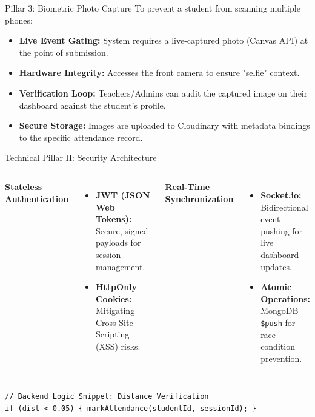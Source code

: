 \documentclass[11pt, aspectratio=169]{beamer}
\begin{document}
\begin{frame}{Pillar 3: Biometric Photo Capture}
    To prevent a student from scanning multiple phones:
    \begin{itemize}
        \item \textbf{Live Event Gating:} System requires a live-captured photo (Canvas API) at the point of submission.
        \item \textbf{Hardware Integrity:} Accesses the front camera to ensure "selfie" context.
        \item \textbf{Verification Loop:} Teachers/Admins can audit the captured image on their dashboard against the student's profile.
        \item \textbf{Secure Storage:} Images are uploaded to Cloudinary with metadata bindings to the specific attendance record.
    \end{itemize}
\end{frame}

\begin{frame}{Technical Pillar II: Security Architecture}
    \begin{columns}
        \textbf{Stateless Authentication}
        \begin{itemize}
            \item \textbf{JWT (JSON Web Tokens):} Secure, signed payloads for session management.
            \item \textbf{HttpOnly Cookies:} Mitigating Cross-Site Scripting (XSS) risks.
        \end{itemize}
        \textbf{Real-Time Synchronization}
        \begin{itemize}
            \item \textbf{Socket.io:} Bidirectional event pushing for live dashboard updates.
            \item \textbf{Atomic Operations:} MongoDB \texttt{\$push} for race-condition prevention.
        \end{itemize}
    \end{columns}
    \vspace{0.4cm}
    \begin{center}
        \scriptsize \texttt{// Backend Logic Snippet: Distance Verification} \\
        \texttt{if (dist < 0.05) \{ markAttendance(studentId, sessionId); \}}
    \end{center}
\end{frame}
\end{document}

